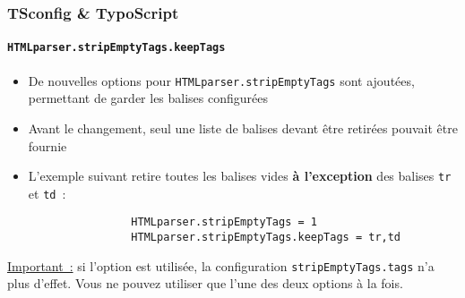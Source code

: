 \begin{frame}[fragile]
	\frametitle{TSconfig \& TypoScript}
	\framesubtitle{\texttt{HTMLparser.stripEmptyTags.keepTags}}

	\lstset{basicstyle=\tiny\ttfamily}

	\begin{itemize}

		\item De nouvelles options pour \texttt{HTMLparser.stripEmptyTags} sont ajoutées,
			permettant de garder les balises configurées
		\item Avant le changement, seul une liste de balises devant être retirées pouvait être fournie
		\item L'exemple suivant retire toutes les balises vides \textbf{à l'exception} des balises
		 	\texttt{tr} et \texttt{td}~:

			\begin{lstlisting}
				HTMLparser.stripEmptyTags = 1
				HTMLparser.stripEmptyTags.keepTags = tr,td
			\end{lstlisting}

	\end{itemize}

	\underline{Important~:} si l'option est utilisée, la configuration \texttt{stripEmptyTags.tags}
		n'a plus d'effet. Vous ne pouvez utiliser que l'une des deux options à la fois.

\end{frame}

